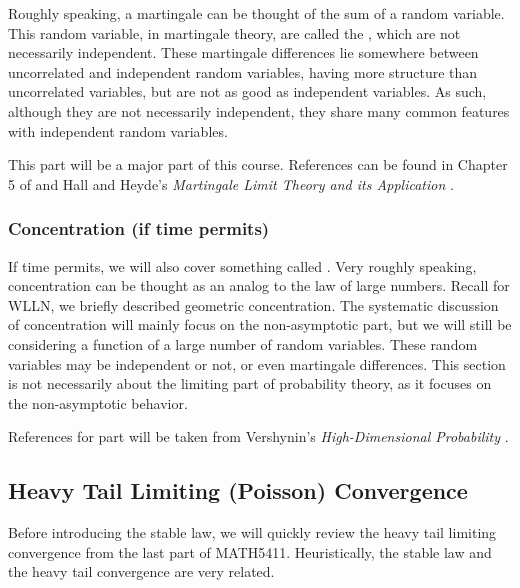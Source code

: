 \documentclass[../main/main.tex]{subfiles}
\begin{document}
Roughly speaking, a martingale can be thought of the sum of a random variable. This random variable, in martingale theory, are called the , which are not necessarily independent. These martingale differences lie somewhere between uncorrelated and independent random variables, having more structure than uncorrelated variables, but are not as good as independent variables. As such, although they are not necessarily independent, they share many common features with independent random variables.\\

\begin{remark}
	This part will be a major part of this course. References can be found in Chapter 5 of \cite{Dur19} and Hall and Heyde's \textit{Martingale Limit Theory and its Application} \cite{Hall80}.
\end{remark}


\subsubsection{Concentration (if time permits)}

If time permits, we will also cover something called . Very roughly speaking, concentration can be thought as an analog to the law of large numbers. Recall for WLLN, we briefly described geometric concentration. The systematic discussion of concentration will mainly focus on the non-asymptotic part, but we will still be considering a function of a large number of random variables. These random variables may be independent or not, or even martingale differences. This section is not necessarily about the limiting part of probability theory, as it focuses on the non-asymptotic behavior.

\begin{remark}
	References for part will be taken from Vershynin's \textit{High-Dimensional Probability} \cite{Ver19}.
\end{remark}


\subsection{Heavy Tail Limiting (Poisson) Convergence}

Before introducing the stable law, we will quickly review the heavy tail limiting convergence from the last part of MATH5411. Heuristically, the stable law and the heavy tail convergence are very related.
\end{document}
